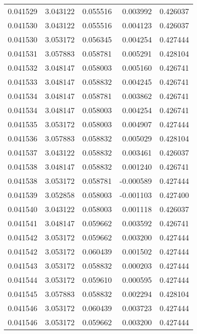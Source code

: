 \begin{tabular}{lrrrr}
0.041529    &  3.043122 &  0.055516 &  0.003992 &             0.426037 \\
0.041530    &  3.043122 &  0.055516 &  0.004123 &             0.426037 \\
0.041530    &  3.053172 &  0.056345 &  0.004254 &             0.427444 \\
0.041531    &  3.057883 &  0.058781 &  0.005291 &             0.428104 \\
0.041532    &  3.048147 &  0.058003 &  0.005160 &             0.426741 \\
0.041533    &  3.048147 &  0.058832 &  0.004245 &             0.426741 \\
0.041534    &  3.048147 &  0.058781 &  0.003862 &             0.426741 \\
0.041534    &  3.048147 &  0.058003 &  0.004254 &             0.426741 \\
0.041535    &  3.053172 &  0.058003 &  0.004907 &             0.427444 \\
0.041536    &  3.057883 &  0.058832 &  0.005029 &             0.428104 \\
0.041537    &  3.043122 &  0.058832 &  0.003461 &             0.426037 \\
0.041538    &  3.048147 &  0.058832 &  0.001240 &             0.426741 \\
0.041538    &  3.053172 &  0.058781 & -0.000589 &             0.427444 \\
0.041539    &  3.052858 &  0.058003 & -0.001103 &             0.427400 \\
0.041540    &  3.043122 &  0.058003 &  0.001118 &             0.426037 \\
0.041541    &  3.048147 &  0.059662 &  0.003592 &             0.426741 \\
0.041542    &  3.053172 &  0.059662 &  0.003200 &             0.427444 \\
0.041542    &  3.053172 &  0.060439 &  0.001502 &             0.427444 \\
0.041543    &  3.053172 &  0.058832 &  0.000203 &             0.427444 \\
0.041544    &  3.053172 &  0.059610 &  0.000595 &             0.427444 \\
0.041545    &  3.057883 &  0.058832 &  0.002294 &             0.428104 \\
0.041546    &  3.053172 &  0.060439 &  0.003723 &             0.427444 \\
0.041546    &  3.053172 &  0.059662 &  0.003200 &             0.427444 \\

\end{tabular}
